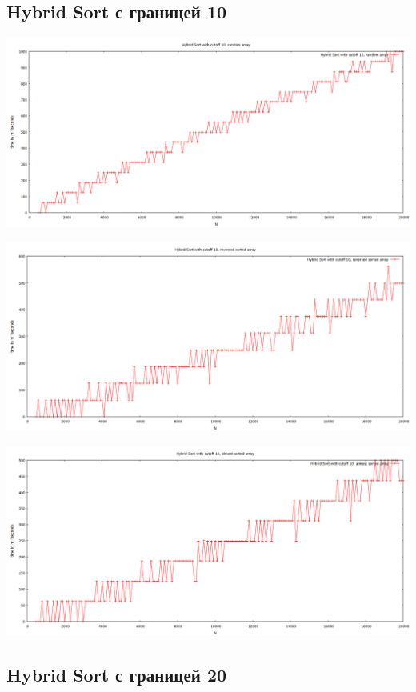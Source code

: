 \documentclass[11pt,a4paper]{article}
\begin{document}
\subsection*{Hybrid Sort с границей 10}

\hspace*{-2cm} \includegraphics[scale=0.5]{hybrid_sort_10_random_arr.PNG}

\hspace*{-2cm} \includegraphics[scale=0.5]{hybrid_sort_10_reversed_arr.PNG}

\hspace*{-2cm} \includegraphics[scale=0.5]{hybrid_sort_10_almost_sorted_arr.PNG}

\subsection*{Hybrid Sort с границей 20}
\end{document}
